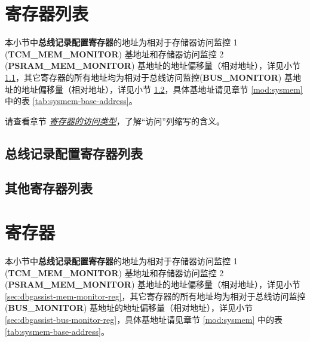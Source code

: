 \documentclass[main\_\_CN.tex]{subfiles}
\begin{document}
\newpage
\begin{landscape}
\hypertarget{dbgassist-reg-summ}{}
\section{寄存器列表}
\label{sec:dbgassist-reg-summ}

本小节中\textbf{总线记录配置寄存器}的地址为相对于存储器访问监控 1 (\textbf{TCM\_MEM\_MONITOR}) 基地址和存储器访问监控 2 (\textbf{PSRAM\_MEM\_MONITOR}) 基地址的地址偏移量（相对地址），详见小节 \ref{sec:dbgassist-mem-monitor-reg-summ}，其它寄存器的所有地址均为相对于总线访问监控(\textbf{BUS\_MONITOR}) 基地址的地址偏移量（相对地址），详见小节 \ref{sec:dbgassist-bus-monitor-reg-summ}，具体基地址请见章节 \ref{mod:sysmem} \textit{} 中的表 \ref{tab:sysmem-base-address}。

请查看章节 \hyperref[glossary-access-types]{\textit{寄存器的访问类型}}，了解“访问”列缩写的含义。

\subsection{总线记录配置寄存器列表}
\label{sec:dbgassist-mem-monitor-reg-summ}



\subsection{其他寄存器列表}
\label{sec:dbgassist-bus-monitor-reg-summ}


\end{landscape}


\newpage
\section{寄存器}

本小节中\textbf{总线记录配置寄存器}的地址为相对于存储器访问监控 1 (\textbf{TCM\_MEM\_MONITOR}) 基地址和存储器访问监控 2 (\textbf{PSRAM\_MEM\_MONITOR}) 基地址的地址偏移量（相对地址），详见小节 \ref{sec:dbgassist-mem-monitor-reg}，其它寄存器的所有地址均为相对于总线访问监控(\textbf{BUS\_MONITOR}) 基地址的地址偏移量（相对地址），详见小节 \ref{sec:dbgassist-bus-monitor-reg}，具体基地址请见章节 \ref{mod:sysmem} \textit{} 中的表 \ref{tab:sysmem-base-address}。
\end{document}
